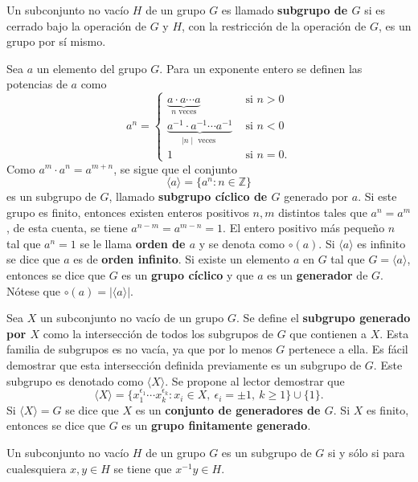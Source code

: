 \begin{definicion}
Un subconjunto no vacío $H$ de un grupo $G$ es llamado \textbf{subgrupo de $G$} si es cerrado bajo la operación de $G$ y $H$, con la restricción de la operación de $G$, es un grupo por sí mismo.
\end{definicion}
\begin{ejemplo}
Sea $a$ un elemento del grupo $G$. Para un exponente entero se definen las potencias de $a$ como
\[ a^n = \left\{ \begin{array}{lr}
\underset{n\mbox{ veces}}{\underbrace{a \cdot a \cdots a}} & \mbox{ si } n >0\\
\underset{\mid n \mid \mbox{ veces }}{\underbrace{a^{-1}\cdot a^{-1}\cdots a^{-1}}} & \mbox{ si } n<0 \\
1 & \mbox{ si } n = 0.
\end{array} \right.  \]
Como $a^m \cdot a^n = a^{m+n}$, se sigue que el conjunto
\[\langle a \rangle = \{ a^n : n \in \mathds{Z} \} \]
es un subgrupo de $G$, llamado \textbf{subgrupo cíclico de $G$} generado por $a$.
Si este grupo es finito, entonces existen enteros positivos $n,m$ distintos tales que $a^n = a^m$, de esta cuenta, se tiene $a^{n-m} = a^{m-n} = 1$. El entero positivo más pequeño $n$  tal que $a^n = 1$ se le llama \textbf{orden de $a$} y se denota como $\circ(a)$. Si $\langle a \rangle$ es infinito se dice que $a$ es de \textbf{orden infinito}.
Si existe un elemento $a$ en $G$ tal que $G = \langle a \rangle$, entonces se dice que $G$ es un \textbf{grupo cíclico} y que $a$ es un \textbf{generador} de $G$. Nótese que $\circ(a) = | \langle a \rangle | $.
\end{ejemplo}
\begin{ejemplo}
Sea $X$ un subconjunto no vacío de un grupo $G$. Se define el \textbf{subgrupo generado por $X$} como la intersección de todos los subgrupos de $G$ que contienen a $X$. Esta familia de subgrupos es no vacía, ya que por lo menos $G$ pertenece a ella. Es fácil demostrar que esta intersección definida previamente es un subgrupo de $G$. Este subgrupo es denotado como $\langle X \rangle$. Se propone al lector demostrar que 
\[ \langle X \rangle = \{ x_1^{\epsilon_1} \cdots x_k^{\epsilon_k} \colon x_i \in X, \ \epsilon_i = \pm 1, \ k \geq 1 \} \cup \{1\} .\]
Si $\langle X \rangle = G$ se dice que $X$ es un \textbf{conjunto de generadores de $G$}. Si $X$ es finito, entonces se dice que $G$ es un \textbf{grupo finitamente generado}.
\end{ejemplo}
 \begin{lema}
 Un subconjunto no vacío $H$ de un grupo $G$ es un subgrupo de $G$ si y sólo si para cualesquiera $x,y \in H$ se tiene que $x^{-1}y \in H$.
 \end{lema}

